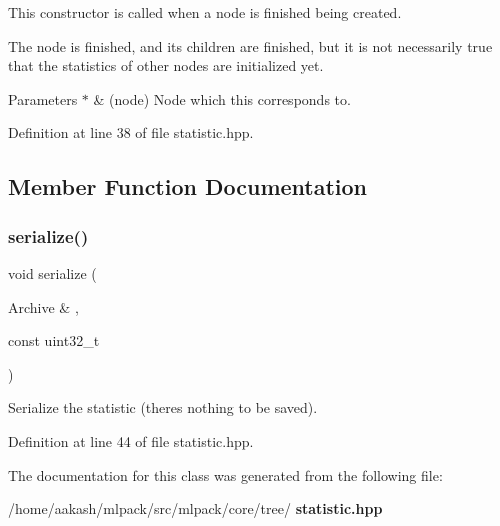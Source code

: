 This constructor is called when a node is finished being created. 

The node is finished, and its children are finished, but it is not necessarily true that the statistics of other nodes are initialized yet.


\begin{DoxyParams}{Parameters}
{\em $\ast$} & (node) Node which this corresponds to. \\
\hline
\end{DoxyParams}


Definition at line 38 of file statistic.\+hpp.



\subsection{Member Function Documentation}
\mbox{\label{classmlpack_1_1tree_1_1EmptyStatistic_aa2ccb5a0533a6ba0abe6dfc1f98fbafb}} 
\subsubsection{serialize()}
{\footnotesize\ttfamily void serialize (\begin{DoxyParamCaption}\item[{Archive \&}]{,  }\item[{const uint32\+\_\+t}]{ }\end{DoxyParamCaption})\hspace{0.3cm}{\ttfamily [inline]}}



Serialize the statistic (there\textquotesingle{}s nothing to be saved). 



Definition at line 44 of file statistic.\+hpp.



The documentation for this class was generated from the following file\+:\begin{DoxyCompactItemize}
\item 
/home/aakash/mlpack/src/mlpack/core/tree/\textbf{ statistic.\+hpp}\end{DoxyCompactItemize}
